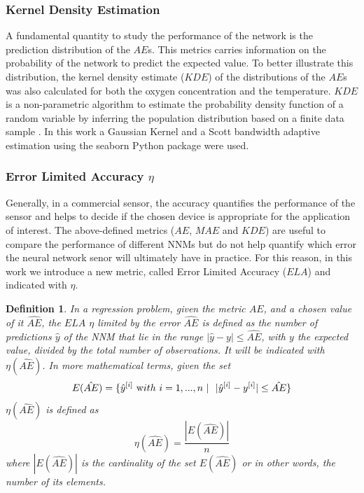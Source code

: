 \documentclass[sensors,article,submit,moreauthors,pdftex,10pt,a4paper]{Definitions/mdpi}
\newtheorem*{definition*}{Definition}
\begin{document}
\subsubsection{Kernel Density Estimation}

A fundamental quantity to study the performance of the network is the prediction distribution of the $AE$s. This metrics carries information on the probability of the network to predict the expected value. To better illustrate this distribution, the kernel density estimate ($KDE$) of the distributions of the $AE$s was also calculated for both the oxygen concentration and the temperature. $KDE$ is a non-parametric algorithm to estimate the probability density function of a random variable by inferring the population distribution based on a finite data sample \cite{Hastie2009}.  In this work a Gaussian Kernel and a Scott bandwidth adaptive estimation \cite{Sain1996} using the seaborn Python package \cite{Waskom2020} were used.


\subsubsection{Error Limited Accuracy $\eta$}
\label{sektion:ela}

Generally, in a commercial sensor, the accuracy quantifies the performance of the sensor and helps to decide if the chosen device is appropriate for the application of interest. The above-defined metrics ($AE$, $MAE$ and $KDE$) are useful to compare the performance of different NNMs but do not help quantify which error the neural network senor will ultimately have in practice.
For this reason, in this work we introduce a new metric, called Error Limited Accuracy ($ELA$) and indicated with $\eta$.

\begin{definition*}
In a regression problem, given the metric $AE$, and a chosen value of it $\hat{AE}$, the $ELA$  $\eta$ limited by the error $\hat{AE}$ is defined as the number of predictions $\hat y$ of the NNM that lie in the range $|\hat y-y|\leq \hat{AE}$, with $y$ the expected value, divided by the total number of observations. It will be indicated with $\eta(\hat{AE})$. In more mathematical terms, given the set
\begin{equation}
E(\hat{AE}) = \{ \hat y^{[i]} \ {\text with } \ i = 1,..., n\ | \ \ |\hat y^{[i]}-y^{[i]}|\leq \hat{AE} \} 
\end{equation}
$\eta(\hat{AE})$ is defined as
\begin{equation}
\eta(\hat{AE}) = \frac{|E(\hat{AE})|}{n}
\end{equation}
where $|E(\hat{AE})|$ is the cardinality of the set $E(\hat{AE})$ or in other words, the number of its elements.
\end{definition*}
\end{document}
